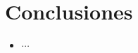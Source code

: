 \section{Conclusiones}

\begin{frame}
    \begin{itemize}
        \item $\cdots$
    \end{itemize}
\end{frame}